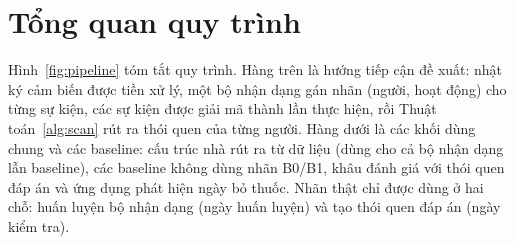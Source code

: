 \section{Tổng quan quy trình}
\label{sec:m-overview}

Hình~\ref{fig:pipeline} tóm tắt quy trình. Hàng trên là hướng tiếp cận đề xuất: nhật ký cảm biến được
tiền xử lý, một bộ nhận dạng gán nhãn (người, hoạt động) cho từng sự kiện, các sự kiện được giải mã thành
lần thực hiện, rồi Thuật toán~\ref{alg:scan} rút ra thói quen của từng người. Hàng dưới là các khối dùng
chung và các baseline: cấu trúc nhà rút ra từ dữ liệu (dùng cho cả bộ nhận dạng lẫn baseline), các baseline
không dùng nhãn B0/B1, khâu đánh giá với thói quen đáp án và ứng dụng phát hiện ngày bỏ thuốc. Nhãn thật chỉ
được dùng ở hai chỗ: huấn luyện bộ nhận dạng (ngày huấn luyện) và tạo thói quen đáp án (ngày kiểm tra).

